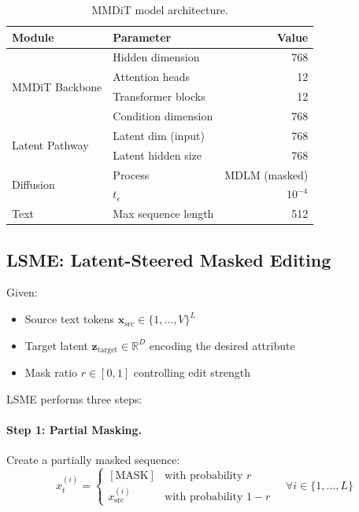 \documentclass{article}
\begin{document}
\begin{table}[t]
\centering
\caption{MMDiT model architecture.}
\label{tab:architecture}
\small
\begin{tabular}{llr}
\toprule
\textbf{Module} & \textbf{Parameter} & \textbf{Value} \\
\midrule
\multirow{4}{*}{MMDiT Backbone} & Hidden dimension & 768 \\
& Attention heads & 12 \\
& Transformer blocks & 12 \\
& Condition dimension & 768 \\
\midrule
\multirow{2}{*}{Latent Pathway} & Latent dim (input) & 768 \\
& Latent hidden size & 768 \\
\midrule
\multirow{2}{*}{Diffusion} & Process & MDLM (masked) \\
& $t_\epsilon$ & $10^{-4}$ \\
\midrule
Text & Max sequence length & 512 \\
\bottomrule
\end{tabular}
\end{table}

\subsection{LSME: Latent-Steered Masked Editing}

Given:
\begin{itemize}
    \item Source text tokens $\mathbf{x}_\text{src} \in \{1, \ldots, V\}^L$
    \item Target latent $\mathbf{z}_\text{target} \in \mathbb{R}^D$ encoding the desired attribute
    \item Mask ratio $r \in [0, 1]$ controlling edit strength
\end{itemize}

LSME performs three steps:

\paragraph{Step 1: Partial Masking.}
Create a partially masked sequence:
\begin{equation}
    x_t^{(i)} = \begin{cases}
        [\text{MASK}] & \text{with probability } r \\
        x_\text{src}^{(i)} & \text{with probability } 1 - r
    \end{cases}
    \quad \forall i \in \{1, \ldots, L\}
\end{equation}
\end{document}
